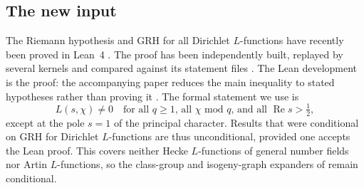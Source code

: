 \subsection{The new input}
The Riemann hypothesis and GRH for all Dirichlet $L$-functions have recently been proved in Lean~4
\cite{alpoge2026,grhlean}. The proof has been independently built, replayed by several kernels and
compared against its statement files \cite{sutherlandgrh,sutherlandshortgrh,rubinsteinpage}. The Lean
development is the proof: the accompanying paper reduces the main inequality to stated hypotheses
rather than proving it \cite{rubinsteinpage}. The formal statement we use is
\[
  L(s,\chi)\ne0\quad\text{for all $q\ge1$, all $\chi$ mod $q$, and all } \operatorname{Re}s>\tfrac12,
\]
except at the pole $s=1$ of the principal character. Results that were conditional on GRH for
Dirichlet $L$-functions are thus unconditional, provided one accepts the Lean proof. This covers
neither Hecke $L$-functions of general number fields nor Artin $L$-functions, so the class-group and
isogeny-graph expanders of \cite{jmv2009} remain conditional.

